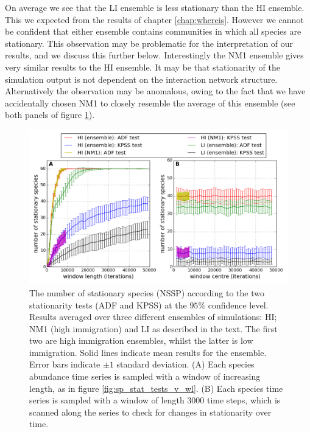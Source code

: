 On average we see that the LI ensemble is less stationary than the HI ensemble. This we expected from the results of chapter \ref{chap:whereis}. However we cannot be confident that either ensemble contains communities in which all species are stationary. This observation may be problematic for the interpretation of our results, and we discuss this further below. Interestingly the NM1 ensemble gives very similar results to the HI ensemble. It may be that stationarity of the simulation output is not dependent on the interaction network structure.  Alternatively the observation may be anomalous, owing to the fact that we have accidentally chosen NM1 to closely resemble the average of this ensemble (see both panels of figure \ref{fig:hi_v_li_net7_ensemble}).  



\begin{figure}[h]
	\centering
	\includegraphics[width=1.0\linewidth]{"./chapters/chapter04b/figures/hi_v_li_net7_ensemble"}
    \caption{The number of stationary species (NSSP) according to the two stationarity tests (ADF and KPSS) at the $95\%$ confidence level. Results averaged over three different ensembles of simulations: HI; NM1 (high immigration) and LI as described in the text. The first two are high immigration ensembles, whilst the latter is low immigration. Solid lines indicate mean results for the ensemble. Error bars indicate $\pm 1$ standard deviation. (A) Each species abundance time series is sampled with a window of increasing length, as in figure \ref{fig:sp_stat_tests_v_wl}. (B) Each species time series is sampled with a window of length 3000 time steps, which is scanned along the series to check for changes in stationarity over time.}    
    \label{fig:hi_v_li_net7_ensemble}
\end{figure}


